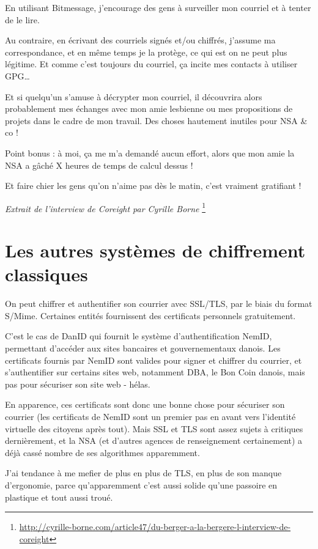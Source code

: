 En utilisant Bitmessage, j'encourage des gens à surveiller mon courriel
et à tenter de le lire.

Au contraire, en écrivant des courriels signés et/ou chiffrés, j'assume
ma correspondance, et en même temps je la protège, ce qui est on ne peut
plus légitime. Et comme c'est toujours du courriel, ça incite mes
contacts à utiliser GPG\ldots{}

Et si quelqu'un s'amuse à décrypter mon courriel, il découvrira alors
probablement mes échanges avec mon amie lesbienne ou mes propositions de
projets dans le cadre de mon travail. Des choses hautement inutiles pour
NSA \& co !

Point bonus : à moi, ça me m'a demandé aucun effort, alors que mon amie la NSA a gâché X heures de temps de calcul dessus !

\begin{quoting}
Et faire chier les gens qu'on n'aime pas dès le matin, c'est vraiment gratifiant !
\end{quoting}

\emph{Extrait de l'interview de Coreight par Cyrille Borne}
\footnote{\url{http://cyrille-borne.com/article47/du-berger-a-la-bergere-l-interview-de-coreight}}

\section{Les autres systèmes de chiffrement classiques}\label{les-autres-systuxe8mes-de-chiffrement-classiques}

On peut chiffrer et authentifier son courrier avec SSL/TLS, par le biais
du format S/Mime. Certaines entités fournissent des certificats personnels gratuitement.

C'est le cas de DanID qui fournit le système d'authentification NemID, permettant d'accéder aux sites bancaires et gouvernementaux danois. Les
certificats fournis par NemID sont valides pour signer et chiffrer du courrier, et s'authentifier sur certains sites web, notamment
DBA, le Bon Coin danois, mais pas pour sécuriser son site web - hélas.

En apparence, ces certificats sont donc une bonne chose pour sécuriser son courrier (les certificats de NemID sont un premier pas en avant vers
l'identité virtuelle des citoyens après tout). Mais SSL et TLS sont assez sujets à critiques dernièrement, et la NSA (et d'autres agences de
renseignement certainement) a déjà cassé nombre de ses algorithmes apparemment.

J'ai tendance à me mefier de plus en plus de TLS, en plus de son manque
d'ergonomie, parce qu'apparemment c'est aussi solide qu'une passoire en
plastique et tout aussi troué.


